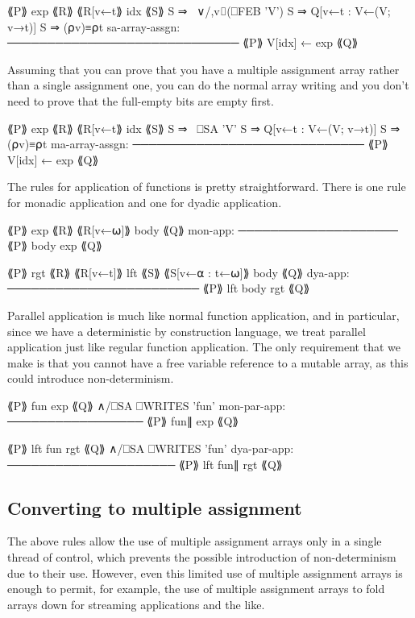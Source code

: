                 ⟪P⟫ exp ⟪R⟫
                ⟪R[v←t⟫ idx ⟪S⟫
                S ⇒ ~∨/,v⌷(⎕FEB 'V')
                S ⇒ Q[v←t : V←(V; v→t)]
                S ⇒ (⍴v)≡⍴t
sa-array-assgn: ─────────────────────────────
                ⟪P⟫ V[idx] ← exp ⟪Q⟫

Assuming that you can prove that you have a multiple assignment array rather
than a single assignment one, you can do the normal array writing and you don't
need to prove that the full-empty bits are empty first.

                ⟪P⟫ exp ⟪R⟫
                ⟪R[v←t⟫ idx ⟪S⟫
                S ⇒ ~⎕SA 'V'
                S ⇒ Q[v←t : V←(V; v→t)]
                S ⇒ (⍴v)≡⍴t
ma-array-assgn: ─────────────────────────────
                ⟪P⟫ V[idx] ← exp ⟪Q⟫

The rules for application of functions is pretty straightforward.
There is one rule for monadic application and one for dyadic 
application.

         ⟪P⟫ exp ⟪R⟫
         ⟪R[v←⍵]⟫ body ⟪Q⟫
mon-app: ────────────────────
         ⟪P⟫ { body } exp ⟪Q⟫

         ⟪P⟫ rgt ⟪R⟫
         ⟪R[v←t]⟫ lft ⟪S⟫
         ⟪S[v←⍺ : t←⍵]⟫ body ⟪Q⟫
dya-app: ────────────────────────
         ⟪P⟫ lft {body} rgt ⟪Q⟫

Parallel application is much like normal function application, 
and in particular, since we have a deterministic by construction
language, we treat parallel application just like regular function
application. The only requirement that we make is that you cannot have a free
variable reference to a mutable array, as this could introduce non-determinism.

             ⟪P⟫ fun exp ⟪Q⟫
             ∧/⎕SA ⎕WRITES 'fun'
mon-par-app: ─────────────────
             ⟪P⟫ fun∥ exp ⟪Q⟫

             ⟪P⟫ lft fun rgt ⟪Q⟫
             ∧/⎕SA ⎕WRITES 'fun'
dya-par-app: ─────────────────────
             ⟪P⟫ lft fun∥ rgt ⟪Q⟫

\subsection{Converting to multiple assignment}

The above rules allow the use of multiple assignment arrays only in a single
thread of control, which prevents the possible introduction of non-determinism
due to their use. However, even this limited use of multiple assignment arrays
is enough to permit, for example, the use of multiple assignment arrays to fold
arrays down for streaming applications and the like. 